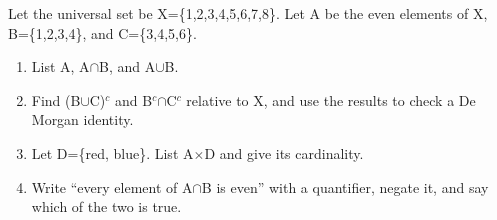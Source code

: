 \documentclass[11pt]{article}
\begin{document}
\begin{keepsection}
\begin{keepsection}
Let the universal set be X=\{1,2,3,4,5,6,7,8\}. Let A be the even elements of X, B=\{1,2,3,4\}, and C=\{3,4,5,6\}.

\begin{enumerate}
\item List A, A\ensuremath{\cap}B, and A\ensuremath{\cup}B.
\item Find (B\ensuremath{\cup}C)\ensuremath{^{c}} and B\ensuremath{^{c}}\ensuremath{\cap}C\ensuremath{^{c}} relative to X, and use the results to check a De Morgan identity.
\item Let D=\{red, blue\}. List A\ensuremath{\times}D and give its cardinality.
\item Write “every element of A\ensuremath{\cap}B is even” with a quantifier, negate it, and say which of the two is true.
\end{enumerate}

\end{keepsection}
\end{keepsection}
\end{document}
